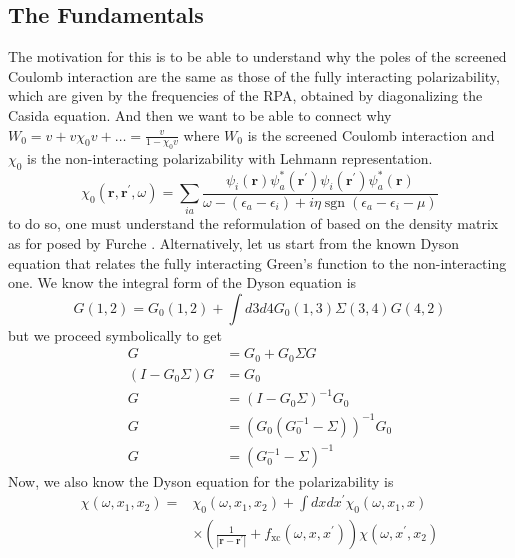 \documentclass[12pt]{article}
\begin{document}
\subsection{The Fundamentals}
The motivation for this is to be able to understand why the poles of the screened Coulomb interaction are the same as those of the fully interacting polarizability, which are given by the frequencies of the RPA, obtained by diagonalizing the Casida equation. And then we want to be able to connect why $W_0 = v + v\chi_0 v + \ldots = \frac{v}{1-\chi_0 v}$ where $W_0$ is the screened Coulomb interaction and $\chi_0$ is the non-interacting polarizability with Lehmann representation. 
\begin{equation}
    \chi_{0}\left(\mathbf{r}, \mathbf{r}^{\prime}, \omega\right)=\sum_{ia}\frac{\psi_{i}(\mathbf{r}) \psi_{a}^{*}(\mathbf{r}^{\prime}) \psi_{i}(\mathbf{r}^{\prime}) \psi_{a}^{*}(\mathbf{r})}{\omega-\left(\epsilon_{a}-\epsilon_{i}\right)+i \eta \operatorname{sgn}\left(\epsilon_{a}-\epsilon_{i} - \mu\right)}
\end{equation}
to do so, one must understand the reformulation of based on the density matrix as for posed by Furche \cite{furche2001density}.
Alternatively, let us start from the known Dyson equation that relates the fully interacting Green's function to the non-interacting one. We know the integral form of the Dyson equation is
\begin{equation}
    G(1,2) = G_0(1,2) + \int d3 d4 G_0(1,3) \Sigma(3,4) G(4,2)
\end{equation}
but we proceed symbolically to get
\begin{align}
    G &= G_0 + G_0 \Sigma G \\
    \left(I - G_0 \Sigma\right) G &= G_0 \\
    G &= \left(I - G_0 \Sigma\right)^{-1} G_0 \\
    G &= \left(G_0\left(G_0^{-1} - \Sigma \right)\right)^{-1} G_0 \\
    G &= \left(G_0^{-1} - \Sigma \right)^{-1}
\end{align}
Now, we also know the Dyson equation for the polarizability is
\begin{equation}
    \begin{aligned}
\chi\left(\omega, x_1, x_2\right)= & \chi_0\left(\omega, x_1, x_2\right)+\int d x d x^{\prime} \chi_0\left(\omega, x_1, x\right) \\
& \times\left(\frac{1}{\left|\mathbf{r}-\mathbf{r}^{\prime}\right|}+f_{\mathrm{xc}}\left(\omega, x, x^{\prime}\right)\right) \chi\left(\omega, x^{\prime}, x_2\right)
\end{aligned}
\end{equation}
\end{document}
